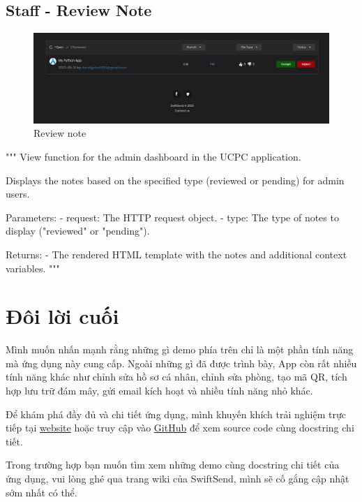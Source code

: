 \documentclass[paper=a4wide, fontsize=12pt]{scrartcl}	 %
\begin{document}
\subsection{Staff - Review Note}
\begin{figure}[H]
    \centering
    \includegraphics[scale=0.4]{demo/review.png}
    \caption{Review note}
\end{figure}

"""
View function for the admin dashboard in the UCPC application.

Displays the notes based on the specified type (reviewed or pending) for admin users.

Parameters:
- request: The HTTP request object.
- type: The type of notes to display ("reviewed" or "pending").

Returns:
- The rendered HTML template with the notes and additional context variables.
"""
\section{Đôi lời cuối}
Mình muốn nhấn mạnh rằng những gì demo phía trên chỉ là một phần tính năng mà ứng dụng này cung cấp. Ngoài những gì đã được trình bày, App còn rất nhiều tính năng khác như chỉnh sửa hồ sơ cá nhân, chỉnh sửa phòng, tạo mã QR, tích hợp lưu trữ đám mây, gửi email kích hoạt và nhiều tính năng nhỏ khác.

Để khám phá đầy đủ và chi tiết ứng dụng, mình khuyến khích trải nghiệm trực tiếp tại \href{https://aligator.pythonanywhere.com}{website} hoặc truy cập vào \href{https://github.com/Dev-Aligator/SwiftSend-Web}{GitHub} để xem source code cùng docstring chi tiết. 

Trong trường hợp bạn muốn tìm xem những demo cùng docstring chi tiết của ứng dụng, vui lòng ghé qua trang wiki của SwiftSend, mình sẽ cố gắng cập nhật sớm nhất có thể.
\end{document}
